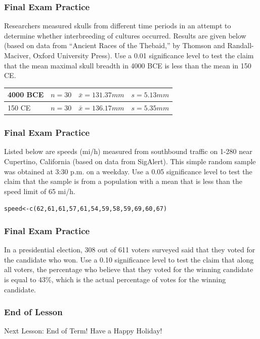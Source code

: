 \documentclass[xcolor=dvipsnames]{beamer}
\begin{document}
\begin{frame}
  \frametitle{Final Exam Practice}
  {\ubung} Researchers measured skulls from different time periods in
  an attempt to determine whether interbreeding of cultures occurred.
  Results are given below (based on data from ``Ancient Races of the
  Thebaid,'' by Thomson and Randall-Maciver, Oxford University Press).
  Use a 0.01 significance level to test the claim that the mean
  maximal skull breadth in 4000 \textsc{BCE} is less than the mean in 150 \textsc{CE}.
  
  \bigskip

  \begin{tabular}{|l|c|c|c|}\hline
    4000 \textsc{BCE} & $n=30$ & $\bar{x}=131.37mm$ & $s=5.13mm$ \\ \hline
    150 \textsc{CE}  & $n=30$ & $\bar{x}=136.17mm$ & $s=5.35mm$ \\ \hline
  \end{tabular}
\end{frame}

\begin{frame}[fragile]
  \frametitle{Final Exam Practice}
  {\ubung} Listed below are speeds (mi/h) measured from southbound
  traffic on 1-280 near Cupertino, California (based on data from
  SigAlert). This simple random sample was obtained at 3:30 p.m.
  on a weekday. Use a 0.05 significance level to test the claim
  that the sample is from a population with a mean that is less
  than the speed limit of 65 mi/h.

\begin{alltt}
speed<-c(62,61,61,57,61,54,59,58,59,69,60,67)
\end{alltt}
\end{frame}

\begin{frame}
  \frametitle{Final Exam Practice}
  {\ubung} In a presidential election, 308 out of 611 voters
  surveyed said that they voted for the candidate who won. Use a
  0.10 significance level to test the claim that along all voters,
  the percentage who believe that they voted for the winning
  candidate is equal to 43\%, which is the actual percentage of
  votes for the winning candidate. 
\end{frame}

\begin{frame}
  \frametitle{End of Lesson}
Next Lesson: End of Term! Have a Happy Holiday!
\end{frame}
\end{document}
